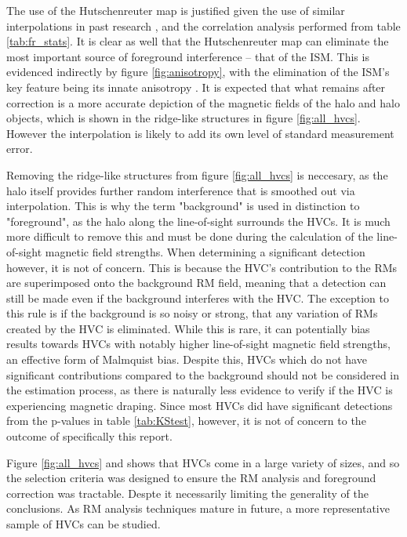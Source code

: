 The use of the Hutschenreuter map is justified given the use of similar interpolations in past research \citep{ID3, ID5, ID6, ID26, ID73}, and the correlation analysis performed from table \ref{tab:fr_stats}. It is clear as well that the Hutschenreuter map can eliminate the most important source of foreground interference – that of the ISM. This is evidenced indirectly by figure \ref{fig:anisotropy}, with the elimination of the ISM's key feature being its innate anisotropy \citep{ID30}. It is expected that what remains after correction is a more accurate depiction of the magnetic fields of the halo and halo objects, which is shown in the ridge-like structures in figure \ref{fig:all_hvcs}. However the interpolation is likely to add its own level of standard measurement error.


Removing the ridge-like structures from figure \ref{fig:all_hvcs} is neccesary, as the halo itself provides further random interference that is smoothed out via interpolation. This is why the term "background" is used in distinction to "foreground", as the halo along the line-of-sight surrounds the HVCs. It is much more difficult to remove this and must be done during the calculation of the line-of-sight magnetic field strengths. When determining a significant detection however, it is not of concern. This is because the HVC's contribution to the RMs are superimposed onto the background RM field, meaning that a detection can still be made even if the background interferes with the HVC. The exception to this rule is if the background is so noisy or strong, that any variation of RMs created by the HVC is eliminated. While this is rare, it can potentially bias results towards HVCs with notably higher line-of-sight magnetic field strengths, an effective form of Malmquist bias. Despite this, HVCs which do not have significant contributions compared to the background should not be considered in the estimation process, as there is naturally less evidence to verify if the HVC is experiencing magnetic draping. Since most HVCs did have significant detections from the p-values in table \ref{tab:KStest}, however, it is not of concern to the outcome of specifically this report.


Figure \ref{fig:all_hvcs} and \cite{ID3} shows that HVCs come in a large variety of sizes, and so the selection criteria was designed to ensure the RM analysis and foreground correction was tractable. Despte it necessarily limiting the generality of the conclusions. As RM analysis techniques mature in future, a more representative sample of HVCs can be studied.


